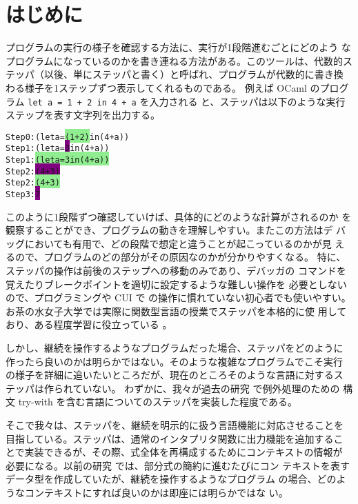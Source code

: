 \section{はじめに}

プログラムの実行の様子を確認する方法に、実行が1段階進むごとにどのよう
なプログラムになっているのかを書き連ねる方法がある。このツールは、代数的ス
テッパ（以後、単にステッパと書く）と呼ばれ、プログラムが代数的に書き換
わる様子を1ステップずつ表示してくれるものである。
例えば OCaml のプログラム \texttt{let a = 1 + 2 in 4 + a} を入力される
と、ステッパは以下のような実行ステップを表す文字列を出力する。

\vspace{-5pt}
\begin{spacing}{0.9}
\begin{alltt}
Step 0:  (let a = \colorbox{lightgreen}{(1 + 2)} in (4 + a))
Step 1:  (let a = \colorbox{purple}{3} in (4 + a))
Step 1:  \colorbox{lightgreen}{(let a = 3 in (4 + a))}
Step 2:  \colorbox{purple}{(4 + 3)}
Step 2:  \colorbox{lightgreen}{(4 + 3)}
Step 3:  \colorbox{purple}{7}
\end{alltt}
\end{spacing}
\vspace{-5pt}

このように1段階ずつ確認していけば、具体的にどのような計算がされるのか
を観察することができ、プログラムの動きを理解しやすい。またこの方法はデ
バッグにおいても有用で、どの段階で想定と違うことが起こっているのかが見
えるので、プログラムのどの部分がその原因なのかが分かりやすくなる。
特に、ステッパの操作は前後のステップへの移動のみであり、デバッガの
コマンドを覚えたりブレークポイントを適切に設定するような難しい操作を
必要としないので、プログラミングや CUI で の操作に慣れていない初心者でも使いやすい。
お茶の水女子大学では実際に関数型言語の授業でステッパを本格的に使
用しており、ある程度学習に役立っている \cite{FCA19}。

しかし、継続を操作するようなプログラムだった場合、ステッパをどのように
作ったら良いのかは明らかではない。そのような複雑なプログラムでこそ実行
の様子を詳細に追いたいところだが、現在のところそのような言語に対するス
テッパは作られていない。
わずかに、我々が過去の研究 \cite{FCA19} で例外処理のための
構文 try-with を含む言語についてのステッパを実装した程度である。

そこで我々は、ステッパを、継続を明示的に扱う言語機能に対応させることを
目指している。ステッパは、通常のインタプリタ関数に出力機能を追加するこ
とで実装できるが、その際、式全体を再構成するためにコンテキストの情報が
必要になる。以前の研究 \cite{FCA19} では、部分式の簡約に進むたびにコン
テキストを表すデータ型を作成していたが、継続を操作するようなプログラム
の場合、どのようなコンテキストにすれば良いのかは即座には明らかではな
い。


